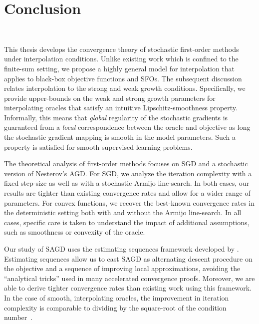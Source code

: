\acresetall 
\chapter{Conclusion}~\label{ch:conclusion}

This thesis develops the convergence theory of stochastic first-order methods under interpolation conditions. 
Unlike existing work which is confined to the finite-sum setting, we propose a highly general model for interpolation that applies to black-box objective functions and \acp{SFO}. 
The subsequent discussion relates interpolation to the strong and weak growth conditions.
Specifically, we provide upper-bounds on the weak and strong growth parameters for interpolating oracles that satisfy an intuitive Lipschitz-smoothness property. 
Informally, this means that \emph{global} regularity of the stochastic gradients is guaranteed from a \emph{local} correspondence between the oracle and objective as long the stochastic gradient mapping is smooth in the model parameters. 
Such a property is satisfied for smooth supervised learning problems. 

The theoretical analysis of first-order methods focuses on \ac{SGD} and a stochastic version of Nesterov's \acl{AGD}. 
For \ac{SGD}, we analyze the iteration complexity with a fixed step-size as well as with a stochastic Armijo line-search.
In both cases, our results are tighter than existing convergence rates and allow for a wider range of parameters.
For convex functions, we recover the best-known convergence rates in the deterministic setting both with and without the Armijo line-search.
In all cases, specific care is taken to understand the impact of additional assumptions, such as smoothness or convexity of the oracle.

Our study of \ac{SAGD} uses the estimating sequences framework developed by \citet{nesterov2004lectures}.
Estimating sequences allow us to cast \ac{SAGD} as alternating descent procedure on the objective and a sequence of improving local approximations, avoiding the ``analytical tricks'' used in many accelerated convergence proofs. 
Moreover, we are able to derive tighter convergence rates than existing work using this framework. 
In the case of smooth, interpolating oracles, the improvement in iteration complexity is comparable to dividing by the square-root of the condition number~\citep{vaswani2019fast}.

